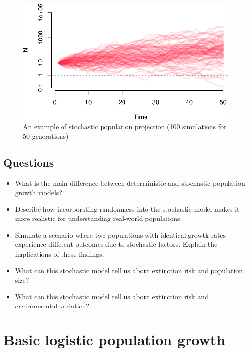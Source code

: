 \documentclass[
  a4paper]{book}
\providecommand{\tightlist}{%
  \setlength{\itemsep}{0pt}\setlength{\parskip}{0pt}}
\begin{document}
\begin{figure}

{\centering \includegraphics{BB512_files/figure-latex/stochProjection-1} 

}

\caption{An example of stochastic population projection (100 simulations for 50 generations)}\label{fig:stochProjection}
\end{figure}

\hypertarget{questions-3}{%
\section{Questions}\label{questions-3}}

\begin{itemize}
\tightlist
\item
  What is the main difference between deterministic and stochastic population growth models?
\item
  Describe how incorporating randomness into the stochastic model makes it more realistic for understanding real-world populations.
\item
  Simulate a scenario where two populations with identical growth rates experience different outcomes due to stochastic factors. Explain the implications of these findings.
\item
  What can this stochastic model tell us about extinction risk and population size?
\item
  What can this stochastic model tell us about extinction risk and environmental variation?
\end{itemize}

\hypertarget{basic-logistic-population-growth}{%
\chapter{Basic logistic population growth}\label{basic-logistic-population-growth}}
\end{document}
